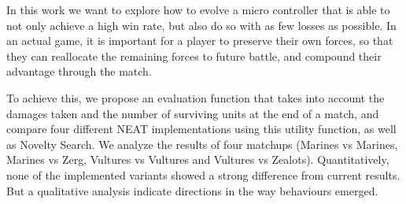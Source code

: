 In this work we want to explore how to evolve a micro controller that
is able to not only achieve a high win rate, but also do so with as
few losses as possible. In an actual game, it is important for a player
to preserve their own forces, so that they can reallocate the remaining
forces to future battle, and compound their advantage through the match.

To achieve this, we propose an evaluation function that takes into
account the damages taken and the number of surviving units at the end
of a match, and compare four different NEAT implementations using this
utility function, as well as Novelty Search. We analyze the results of
four matchups (Marines vs Marines, Marines vs Zerg, Vultures vs
Vultures and Vultures vs Zealots). Quantitatively, none of the
implemented variants showed a strong difference from current
results. But a qualitative analysis indicate directions in the way
behaviours emerged.
